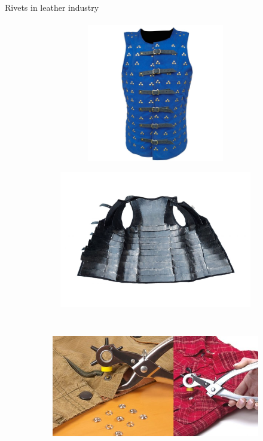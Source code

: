 \documentclass[aspectratio=169]{beamer}
\begin{document}
\begin{frame}[t]{Rivets in leather industry}
    \framesubtitle{}
    \vspace{-0.6cm}
    \begin{figure}[H]
        \begin{subfigure}{0.32\textwidth}
            \centering\includegraphics[height=6cm,width=1\textwidth,keepaspectratio]{brigantine_top.jpg}
            \label{fig:brigantine_top.jpg}
        \end{subfigure}
        \begin{subfigure}{0.32\textwidth}
            \centering\includegraphics[height=6cm,width=1\textwidth,keepaspectratio]{brigantine_hop.jpg}
            \label{fig:brigantine_hop.jpg}
        \end{subfigure}
        \begin{subfigure}{0.32\textwidth}
            \centering\includegraphics[height=6cm,width=1\textwidth,keepaspectratio]{rivets_leather.jpg}
            \label{fig:rivets_leather.jpg}
        \end{subfigure}
    \end{figure}
\end{frame}
\end{document}

